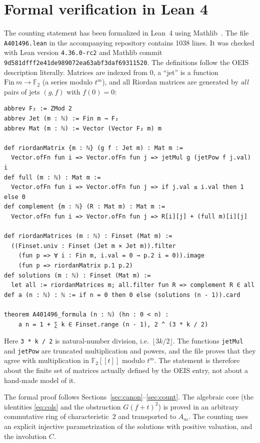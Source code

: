 \documentclass[11pt,a4paper]{amsart}
\theoremstyle{definition}
\theoremstyle{remark}
\newcommand{\F}{\mathbb{F}_2}
\begin{document}
\section{Formal verification in Lean 4}\label{sec:lean}

The counting statement has been formalized in Lean~4 using Mathlib~\cite{mathlib,lean4}. The file \texttt{A401496.lean} in the accompanying repository contains 1038 lines. It was checked with Lean version \texttt{4.36.0-rc2} and Mathlib commit \texttt{9d581dff\allowbreak f2e41de989072ea63abf3daf69311520}. The definitions follow the OEIS description literally. Matrices are indexed from $0$, a ``jet'' is a function $\mathrm{Fin}\ m\to\F$ (a series modulo $t^m$), and all Riordan matrices are generated by \emph{all} pairs of jets $(g,f)$ with $f(0)=0$:
\begin{lstlisting}
abbrev F₂ := ZMod 2
abbrev Jet (m : ℕ) := Fin m → F₂
abbrev Mat (m : ℕ) := Vector (Vector F₂ m) m

def riordanMatrix {m : ℕ} (g f : Jet m) : Mat m :=
  Vector.ofFn fun i => Vector.ofFn fun j => jetMul g (jetPow f j.val) i
def full (m : ℕ) : Mat m :=
  Vector.ofFn fun i => Vector.ofFn fun j => if j.val ≤ i.val then 1 else 0
def complement {m : ℕ} (R : Mat m) : Mat m :=
  Vector.ofFn fun i => Vector.ofFn fun j => R[i][j] + (full m)[i][j]

def riordanMatrices (m : ℕ) : Finset (Mat m) :=
  ((Finset.univ : Finset (Jet m × Jet m)).filter
    (fun p => ∀ i : Fin m, i.val = 0 → p.2 i = 0)).image
    (fun p => riordanMatrix p.1 p.2)
def solutions (m : ℕ) : Finset (Mat m) :=
  let all := riordanMatrices m; all.filter fun R => complement R ∈ all
def a (n : ℕ) : ℕ := if n = 0 then 0 else (solutions (n - 1)).card

theorem A401496_formula (n : ℕ) (hn : 0 < n) :
    a n = 1 + ∑ k ∈ Finset.range (n - 1), 2 ^ (3 * k / 2)
\end{lstlisting}
Here \texttt{3 * k / 2} is natural-number division, i.e.\ $\lfloor 3k/2\rfloor$. The functions \texttt{jetMul} and \texttt{jetPow} are truncated multiplication and powers, and the file proves that they agree with multiplication in $\F[[t]]$ modulo $t^m$. The statement is therefore about the finite set of matrices actually defined by the OEIS entry, not about a hand-made model of it.

The formal proof follows Sections~\ref{sec:canon}--\ref{sec:count}. The algebraic core (the identities \eqref{eq:cols} and the obstruction $G(f+t)^2$) is proved in an arbitrary commutative ring of characteristic~$2$ and transported to $A_m$. The counting uses an explicit injective parametrization of the solutions with positive valuation, and the involution $C$.
\end{document}

